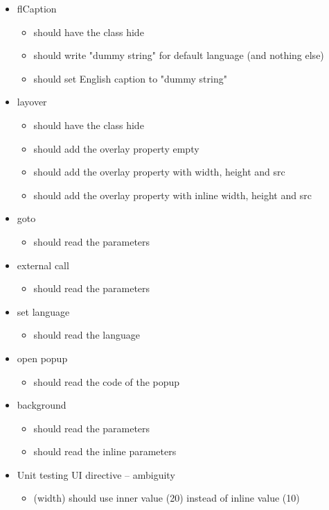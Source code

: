 \begin{itemize}
\begin{itemize}
		\end{itemize}
	\item flCaption
		\begin{itemize}
			\item should have the class hide
			\item should write "dummy string" for default language (and nothing else)
			\item should set English caption to "dummy string"
		\end{itemize}
	\item layover
		\begin{itemize}
			\item should have the class hide
			\item should add the overlay property empty
			\item should add the overlay property with width, height and src
			\item should add the overlay property with inline width, height and src
		\end{itemize}
	\item goto
		\begin{itemize}
			\item should read the parameters
		\end{itemize}
	\item external call
		\begin{itemize}
			\item should read the parameters
		\end{itemize}
	\item set language
		\begin{itemize}
			\item should read the language
		\end{itemize}
	\item open popup
		\begin{itemize}
			\item should read the code of the popup
		\end{itemize}
	\item background
		\begin{itemize}
			\item should read the parameters
			\item should read the inline parameters
		\end{itemize}	
	\item Unit testing UI directive -- ambiguity
		\begin{itemize}
			\item (width) should use inner value (20) instead of inline value (10)

\end{itemize}
\end{itemize}
